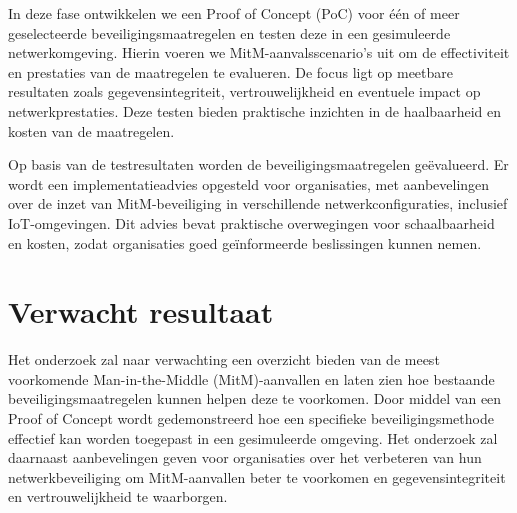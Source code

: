In deze fase ontwikkelen we een Proof of Concept (PoC) voor één of meer geselecteerde beveiligingsmaatregelen en testen deze in een gesimuleerde netwerkomgeving. Hierin voeren we MitM-aanvalsscenario's uit om de effectiviteit en prestaties van de maatregelen te evalueren. De focus ligt op meetbare resultaten zoals gegevensintegriteit, vertrouwelijkheid en eventuele impact op netwerkprestaties. Deze testen bieden praktische inzichten in de haalbaarheid en kosten van de maatregelen.


Op basis van de testresultaten worden de beveiligingsmaatregelen geëvalueerd. Er wordt een implementatieadvies opgesteld voor organisaties, met aanbevelingen over de inzet van MitM-beveiliging in verschillende netwerkconfiguraties, inclusief IoT-omgevingen. Dit advies bevat praktische overwegingen voor schaalbaarheid en kosten, zodat organisaties goed geïnformeerde beslissingen kunnen nemen.


\section{Verwacht resultaat}%
\label{sec:verwachte_resultaten}

Het onderzoek zal naar verwachting een overzicht bieden van de meest voorkomende Man-in-the-Middle (MitM)-aanvallen en laten zien hoe bestaande beveiligingsmaatregelen kunnen helpen deze te voorkomen. Door middel van een Proof of Concept wordt gedemonstreerd hoe een specifieke beveiligingsmethode effectief kan worden toegepast in een gesimuleerde omgeving. Het onderzoek zal daarnaast aanbevelingen geven voor organisaties over het verbeteren van hun netwerkbeveiliging om MitM-aanvallen beter te voorkomen en gegevensintegriteit en vertrouwelijkheid te waarborgen.